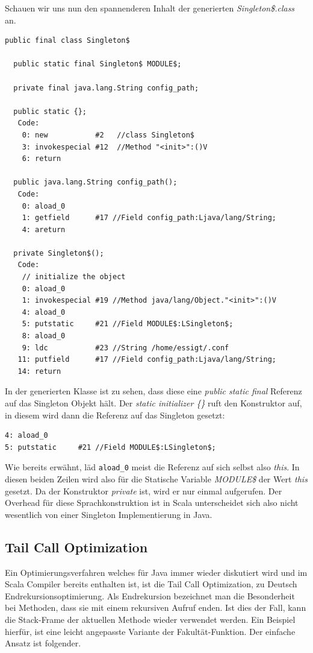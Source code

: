 \documentclass[a4paper, 11pt]{article}
\begin{document}
	  Schauen wir uns nun den spannenderen Inhalt der generierten \textit{Singleton\$.class} an. 
\begin{lstlisting}
public final class Singleton$

  public static final Singleton$ MODULE$;

  private final java.lang.String config_path;

  public static {};
   Code:
    0: new           #2   //class Singleton$
    3: invokespecial #12  //Method "<init>":()V
    6: return

  public java.lang.String config_path();
   Code:
    0: aload_0
    1: getfield      #17 //Field config_path:Ljava/lang/String;
    4: areturn

  private Singleton$();
   Code:
    // initialize the object
    0: aload_0
    1: invokespecial #19 //Method java/lang/Object."<init>":()V
    4: aload_0
    5: putstatic     #21 //Field MODULE$:LSingleton$;
    8: aload_0
    9: ldc           #23 //String /home/essigt/.conf
   11: putfield      #17 //Field config_path:Ljava/lang/String;
   14: return
\end{lstlisting}

	In der generierten Klasse ist zu sehen, dass diese eine \textit{public static final} Referenz auf das Singleton Objekt hält. Der \textit{static initializer \{\}} ruft den Konstruktor auf, in diesem wird dann die Referenz auf das Singleton gesetzt:
\begin{lstlisting}
4: aload_0
5: putstatic     #21 //Field MODULE$:LSingleton$;
\end{lstlisting}
	Wie bereits erwähnt, läd \lstinline|aload_0| meist die Referenz auf sich selbst also \textit{this}. In diesen beiden Zeilen wird also für die Statische Variable \textit{MODULE\$} der Wert \textit{this} gesetzt. Da der Konstruktor \textit{private} ist, wird er nur einmal aufgerufen. Der Overhead für diese Sprachkonstruktion ist in Scala unterscheidet sich also nicht wesentlich von einer Singleton Implementierung in Java.
	

  \subsection{Tail Call Optimization}
	Ein Optimierungsverfahren welches für Java immer wieder diskutiert wird und im Scala Compiler bereits enthalten ist, ist die Tail Call Optimization, zu Deutsch Endrekursionsoptimierung.
	Als Endrekursion bezeichnet man die Besonderheit bei Methoden, dass sie mit einem rekursiven Aufruf enden. Ist dies der Fall, kann die Stack-Frame der aktuellen Methode wieder verwendet werden. Ein Beispiel hierfür, ist eine leicht angepasste Variante der Fakultät-Funktion. Der einfache Ansatz ist folgender.
	
\end{document}
